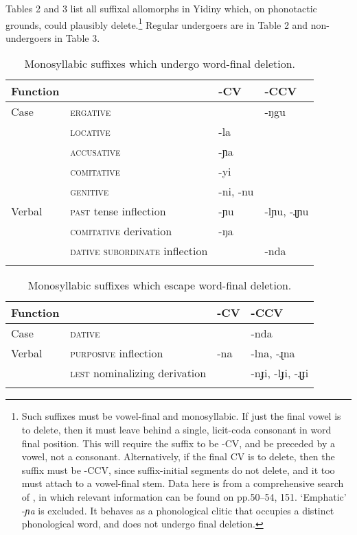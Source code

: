 \documentclass[output=paper,
modfonts
]{LSP/langsci}
\begin{document}
\noindent Tables 2 and 3 list all suffixal allomorphs in Yidiny which, on phonotactic grounds, could plausibly delete.\footnote{Such suffixes must be vowel-final and monosyllabic. If just the final vowel is to delete, then it must leave behind a single, licit-coda consonant in word final position. This will require the suffix to be -CV, and be preceded by a vowel, not a consonant. Alternatively, if the final CV is to delete, then the suffix must be -CCV, since suffix-initial segments do not delete, and it too must attach to a vowel-final stem. Data here is from a comprehensive search of \citet{dixon1977a}, in which relevant information can be found on pp.50--54, 151. `Emphatic' -\textit{ɲa} \citep[151]{dixon1977a} is excluded. It behaves as a phonological clitic that occupies a distinct phonological word, and does not undergo final deletion.}  Regular undergoers are in Table 2 and non-undergoers in Table 3.\newpage

\begin{table}
\caption{Monosyllabic suffixes which undergo word-final deletion.}
\begin{tabular}{llll}
\lsptoprule
\textbf{Function} & & \textbf{-CV} & \textbf{-CCV} \\
\midrule
Case &  \textsc{ergative}  & & {}-ŋgu\\
 & \textsc{locative}  & -la & \\
 &
 \textsc{accusative}  & -ɲa & \\
 & \textsc{comitative}  & -yi & \\
 & \textsc{genitive}  &  -ni, -nu & \\
 \midrule
Verbal & \textsc{past} tense inflection & -ɲu & -lɲu, -ɻɲu\\
 & \textsc{comitative} derivation & -ŋa & \\
 & \textsc{dative subordinate} inflection & & -nda\protect\footnotemark{}\\
 \lspbottomrule
\end{tabular}
\end{table}

\begin{table}
\caption{Monosyllabic suffixes which escape word-final deletion.}
\begin{tabular}{llll}
\lsptoprule
\textbf{Function} & & \textbf{-CV} & \textbf{-CCV} \\
\midrule
Case & \textsc{dative} &  & -nda \\
\midrule
 Verbal & \textsc{purposive} inflection & -na & -lna, -ɻna \\
 & \textsc{lest} nominalizing derivation & & -nɟi, -lɟi, -ɻɟi\\ 
 \lspbottomrule
\end{tabular}
\end{table}
\end{document}
